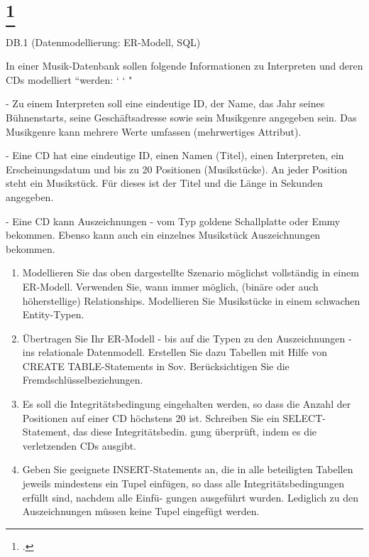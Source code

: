 \documentclass{lehramt-informatik-aufgabe}
\begin{document}
\liAufgabenTitel{}
\section{
\footcite{examen:66116:2015:03}}

DB.1 (Datenmodellierung: ER-Modell, SQL)

In einer Musik-Datenbank sollen folgende Informationen zu Interpreten und deren CDs modelliert
“werden: ‘ ‘ "

- Zu einem Interpreten soll eine eindeutige ID, der Name, das Jahr seines Bühnenstarts, seine Geschäftsadresse sowie sein Musikgenre angegeben sein. Das Musikgenre kann mehrere Werte umfassen (mehrwertiges Attribut).

- Eine CD hat eine eindeutige ID, einen Namen (Titel), einen Interpreten, ein Erscheinungsdatum
und bis zu 20 Positionen (Musikstücke). An jeder Position steht ein Musikstück. Für dieses ist der
Titel und die Länge in Sekunden angegeben.

- Eine CD kann Auszeichnungen - \zB vom Typ goldene Schallplatte oder Emmy bekommen.
Ebenso kann auch ein einzelnes Musikstück Auszeichnungen bekommen.

\begin{enumerate}


\item  Modellieren Sie das oben dargestellte Szenario möglichst
vollständig in einem ER-Modell. Verwenden Sie, wann immer möglich,
(binäre oder auch höherstellige) Relationships. Modellieren Sie
Musikstücke in einem schwachen Entity-Typen.


\item Übertragen Sie Ihr ER-Modell - bis auf die Typen zu den
Auszeichnungen - ins relationale Datenmodell. Erstellen Sie dazu
Tabellen mit Hilfe von CREATE TABLE-Statements in Sov. Berücksichtigen
Sie die Fremdschlüsselbeziehungen.


\item Es soll die Integritätsbedingung eingehalten werden, so dass die
Anzahl der Positionen auf einer CD höchstens 20 ist. Schreiben Sie ein
SELECT-Statement, das diese Integritätsbedin. gung überprüft, indem es
die verletzenden CDs ausgibt.


\item Geben Sie geeignete INSERT-Statements an, die in alle beteiligten
Tabellen jeweils mindestens ein Tupel einfügen, so dass alle
Integritätsbedingungen erfüllt sind, nachdem alle Einfü- gungen
ausgeführt wurden. Lediglich zu den Auszeichnungen müssen keine Tupel
eingefügt werden.
\end{enumerate}
\end{document}

